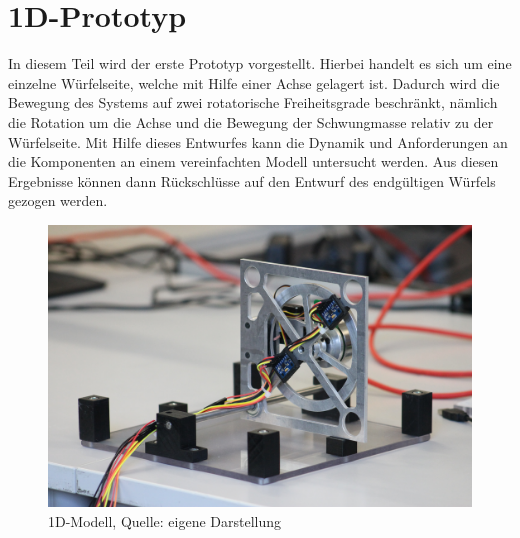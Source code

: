 \section{1D-Prototyp}
In diesem Teil wird der erste Prototyp vorgestellt. Hierbei handelt es sich um eine einzelne Würfelseite, welche mit Hilfe einer Achse gelagert ist. Dadurch wird die Bewegung des Systems auf zwei rotatorische Freiheitsgrade beschränkt, nämlich die Rotation um die Achse und die Bewegung der Schwungmasse relativ zu der Würfelseite. Mit Hilfe dieses Entwurfes kann die Dynamik und Anforderungen an die Komponenten an einem vereinfachten Modell untersucht werden. Aus diesen Ergebnisse können dann Rückschlüsse auf den Entwurf des endgültigen Würfels gezogen werden.
\newline


\begin{figure}[h!]
\includegraphics[width=\linewidth]{img/1D_Model_pic.JPG}
\caption{1D-Modell, Quelle: eigene Darstellung}
\end{figure}